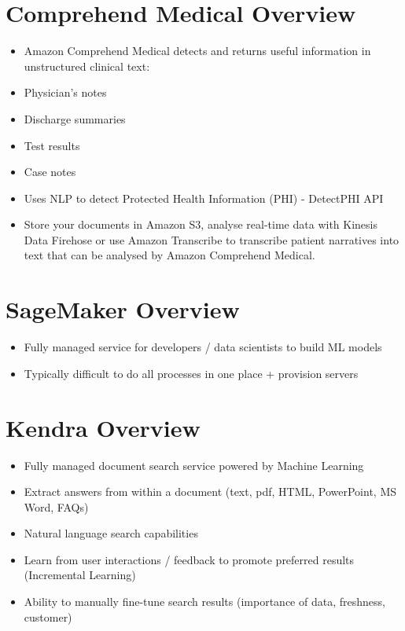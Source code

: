 \section{Comprehend Medical Overview}
\begin{itemize}
    \item Amazon Comprehend Medical detects and returns useful information in unstructured clinical text:
    \item Physician's notes
    \item Discharge summaries
    \item Test results
    \item Case notes
    \item Uses NLP to detect Protected Health Information (PHI) - DetectPHI API
    \item Store your documents in Amazon S3, analyse real-time data with Kinesis Data Firehose or use Amazon Transcribe to transcribe patient narratives into text that can be analysed by Amazon Comprehend Medical.
\end{itemize}


\section{SageMaker Overview}
\begin{itemize}
    \item Fully managed service for developers / data scientists to build ML models
    \item Typically difficult to do all processes in one place + provision servers
\end{itemize}


\section{Kendra Overview}
\begin{itemize}
    \item Fully managed document search service powered by Machine Learning
    \item Extract answers from within a document (text, pdf, HTML, PowerPoint, MS Word, FAQs)
    \item Natural language search capabilities
    \item Learn from user interactions / feedback to promote preferred results (Incremental Learning)
    \item Ability to manually fine-tune search results (importance of data, freshness, customer)
\end{itemize}


